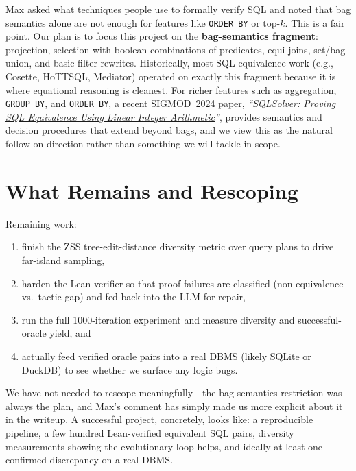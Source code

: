 \documentclass[11pt]{article}
\newcommand{\code}[1]{\texttt{#1}}
\begin{document}
Max asked what techniques people use to formally verify SQL and noted that bag semantics alone are not enough for features like \code{ORDER BY} or top-$k$. This is a fair point. Our plan is to focus this project on the \textbf{bag-semantics fragment}: projection, selection with boolean combinations of predicates, equi-joins, set/bag union, and basic filter rewrites. Historically, most SQL equivalence work (e.g., Cosette, HoTTSQL, Mediator) operated on exactly this fragment because it is where equational reasoning is cleanest. For richer features such as aggregation, \code{GROUP BY}, and \code{ORDER BY}, a recent SIGMOD~2024 paper, \textit{``\href{https://dl.acm.org/doi/pdf/10.1145/3626768}{SQLSolver: Proving SQL Equivalence Using Linear Integer Arithmetic}''}, provides semantics and decision procedures that extend beyond bags, and we view this as the natural follow-on direction rather than something we will tackle in-scope.

\section*{What Remains and Rescoping}

Remaining work:
\begin{enumerate}[leftmargin=*,itemsep=2pt,topsep=2pt]
  \item finish the ZSS tree-edit-distance diversity metric over query plans to drive far-island sampling,
  \item harden the Lean verifier so that proof failures are classified (non-equivalence vs.\ tactic gap) and fed back into the LLM for repair,
  \item run the full 1000-iteration experiment and measure diversity and successful-oracle yield, and
  \item actually feed verified oracle pairs into a real DBMS (likely SQLite or DuckDB) to see whether we surface any logic bugs.
\end{enumerate}
We have not needed to rescope meaningfully---the bag-semantics restriction was always the plan, and Max's comment has simply made us more explicit about it in the writeup. A successful project, concretely, looks like: a reproducible pipeline, a few hundred Lean-verified equivalent SQL pairs, diversity measurements showing the evolutionary loop helps, and ideally at least one confirmed discrepancy on a real DBMS.
\end{document}
